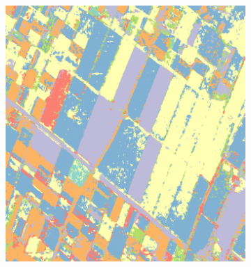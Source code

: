 \documentclass[12pt, a4paper]{article}
\begin{document}
\begin{figure}
\begin{subfigure}[b]{0.15\textwidth}
                  \caption{}
                  \label{fig:SVM}
        \end{subfigure}
        ~
        \begin{subfigure}[b]{0.15\textwidth}
                        \includegraphics[width=\textwidth]{Figures/Kron/ELM_COLOR}
                        \caption{}
                        \label{fig:ELM}
        \end{subfigure}
        

\end{figure}
\end{document}
